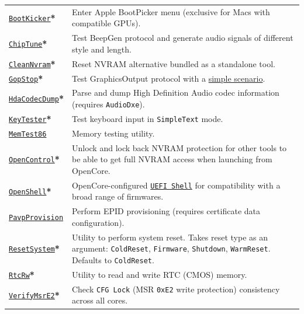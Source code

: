 \documentclass[]{article}
\begin{document}
\begin{tabular}{p{1.3in}p{5.55in}}
\href{https://github.com/acidanthera/OpenCorePkg}{\texttt{BootKicker}}\textbf{*}
& Enter Apple BootPicker menu (exclusive for Macs with compatible GPUs). \\
\href{https://github.com/acidanthera/OpenCorePkg}{\texttt{ChipTune}}\textbf{*}
& Test BeepGen protocol and generate audio signals of different style and length. \\
\href{https://github.com/acidanthera/OpenCorePkg}{\texttt{CleanNvram}}\textbf{*}
& Reset NVRAM alternative bundled as a standalone tool. \\
\href{https://github.com/acidanthera/OpenCorePkg}{\texttt{GopStop}}\textbf{*}
& Test GraphicsOutput protocol with a
  \href{https://github.com/acidanthera/OpenCorePkg/tree/master/Application/GopStop}{simple scenario}. \\
\href{https://github.com/acidanthera/OpenCorePkg}{\texttt{HdaCodecDump}}\textbf{*}
& Parse and dump High Definition Audio codec information (requires \texttt{AudioDxe}). \\
\href{https://github.com/acidanthera/OpenCorePkg}{\texttt{KeyTester}}\textbf{*}
& Test keyboard input in \texttt{SimpleText} mode. \\
\href{https://www.memtest86.com}{\texttt{MemTest86}}
& Memory testing utility. \\
\href{https://github.com/acidanthera/OpenCorePkg}{\texttt{OpenControl}}\textbf{*}
& Unlock and lock back NVRAM protection for other tools to be able to get full NVRAM access
  when launching from OpenCore. \\
\href{https://github.com/acidanthera/OpenCorePkg}{\texttt{OpenShell}}\textbf{*}
& OpenCore-configured \href{http://github.com/tianocore/edk2}{\texttt{UEFI Shell}} for compatibility
  with a broad range of firmwares. \\
\href{https://github.com/acidanthera/OpenCorePkg}{\texttt{PavpProvision}}
& Perform EPID provisioning (requires certificate data configuration). \\
\href{https://github.com/acidanthera/OpenCorePkg}{\texttt{ResetSystem}}\textbf{*}
& Utility to perform system reset. Takes reset type as an argument:
  \texttt{ColdReset}, \texttt{Firmware}, \texttt{Shutdown}, \texttt{WarmReset}.
  Defaults to \texttt{ColdReset}. \\
\href{https://github.com/acidanthera/OpenCorePkg}{\texttt{RtcRw}}\textbf{*}
& Utility to read and write RTC (CMOS) memory. \\
\href{https://github.com/acidanthera/OpenCorePkg}{\texttt{VerifyMsrE2}}\textbf{*}
& Check \texttt{CFG Lock} (MSR \texttt{0xE2} write protection) consistency across all cores.
\end{tabular}
\end{document}
